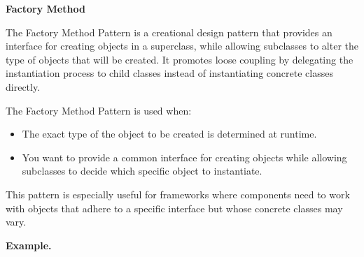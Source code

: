 \medskip
\begin{center}
\textbf{Factory Method}
\end{center}

The Factory Method Pattern is a creational design pattern that provides an interface for creating objects in a superclass, while allowing subclasses to alter the type of objects that will be created. It promotes loose coupling by delegating the instantiation process to child classes instead of instantiating concrete classes directly.

The Factory Method Pattern is used when:

\begin{itemize}
\item The exact type of the object to be created is determined at runtime.

\item You want to provide a common interface for creating objects while allowing subclasses to decide which specific object to instantiate.
\end{itemize}

This pattern is especially useful for frameworks where components need to work with objects that adhere to a specific interface but whose concrete classes may vary.

\textbf{Example.}

